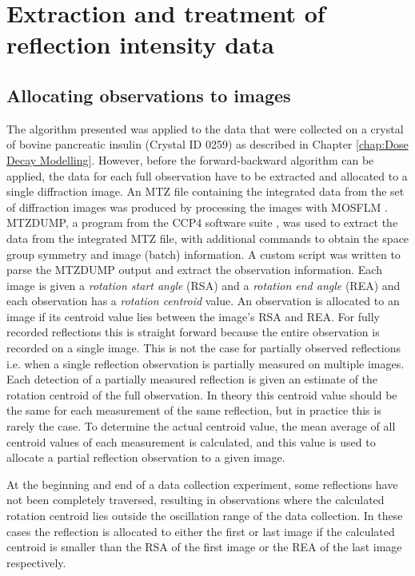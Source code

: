 \section{Extraction and treatment of reflection intensity data}
\label{sec:Extraction and treatment of reflection intensity data}

\subsection{Allocating observations to images}
\label{sub:Allocating observations to images}
The algorithm presented was applied to the data that were collected on a crystal of bovine pancreatic insulin (Crystal ID 0259) as described in Chapter \ref{chap:Dose Decay Modelling}.
However, before the forward-backward algorithm can be applied, the data for each full observation have to be extracted and allocated to a single diffraction image.
An MTZ file containing the integrated data from the set of diffraction images was produced by processing the images with MOSFLM \cite{leslie2007}.
MTZDUMP, a program from the CCP4 software suite \cite{winn2011}, was used to extract the data from the integrated MTZ file, with additional commands to obtain the space group symmetry and image (batch) information.
A custom script was written to parse the MTZDUMP output and extract the observation information.
Each image is given a \textit{rotation start angle} (RSA) and a \textit{rotation end angle} (REA) and each observation has a \textit{rotation centroid} value.
An observation is allocated to an image if its centroid value lies between the image's RSA and REA.
For fully recorded reflections this is straight forward because the entire observation is recorded on a single image.
This is not the case for partially observed reflections i.e. when a single reflection observation is partially measured on multiple images.
Each detection of a partially measured reflection is given an estimate of the rotation centroid of the full observation.
In theory this centroid value should be the same for each measurement of the same reflection, but in practice this is rarely the case.
To determine the actual centroid value, the mean average of all centroid values of each measurement is calculated, and this value is used to allocate a partial reflection observation to a given image.

At the beginning and end of a data collection experiment, some reflections have not been completely traversed, resulting in observations where the calculated rotation centroid lies outside the oscillation range of the data collection.
In these cases the reflection is allocated to either the first or last image if the calculated centroid is smaller than the RSA of the first image or the REA of the last image respectively.


